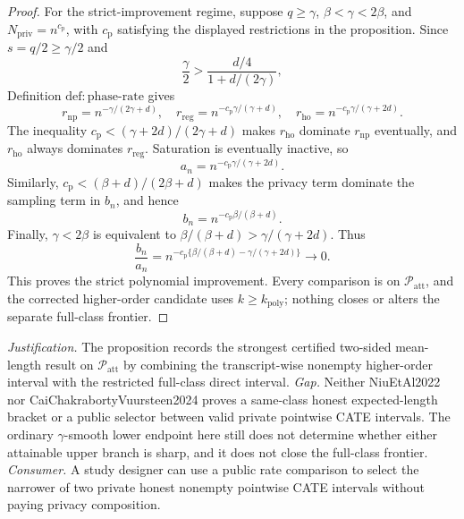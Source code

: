 \documentclass{article}
\begin{document}
\begin{proof}
For the strict-improvement regime, suppose \(q\ge\gamma\), \(\beta<\gamma<2\beta\), and \(N_{\mathrm{priv}}=n^{c_{\mathrm p}}\), with \(c_{\mathrm p}\) satisfying the displayed restrictions in the proposition.  Since \(s=q/2\ge\gamma/2\) and
\[
 \frac{\gamma}{2}>
 \frac{d/4}{1+d/(2\gamma)},
\]
Definition \(\mathrm{def{:}phase\text{-}rate}\) gives
\[
 r_{\mathrm{np}}=n^{-\gamma/(2\gamma+d)},
 \quad r_{\mathrm{reg}}=n^{-c_{\mathrm p}\gamma/(\gamma+d)},
 \quad r_{\mathrm{ho}}=n^{-c_{\mathrm p}\gamma/(\gamma+2d)}.
\tag{16}
\]
The inequality \(c_{\mathrm p}< (\gamma+2d)/(2\gamma+d)\) makes \(r_{\mathrm{ho}}\) dominate \(r_{\mathrm{np}}\) eventually, and \(r_{\mathrm{ho}}\) always dominates \(r_{\mathrm{reg}}\).  Saturation is eventually inactive, so
\[
 a_n=n^{-c_{\mathrm p}\gamma/(\gamma+2d)}.
\tag{17}
\]
Similarly, \(c_{\mathrm p}< (\beta+d)/(2\beta+d)\) makes the privacy term dominate the sampling term in \(b_n\), and hence
\[
 b_n=n^{-c_{\mathrm p}\beta/(\beta+d)}.
\tag{18}
\]
Finally, \(\gamma<2\beta\) is equivalent to \(\beta/(\beta+d)>\gamma/(\gamma+2d)\).  Thus
\[
 \frac{b_n}{a_n}
 =n^{-c_{\mathrm p}\{\beta/(\beta+d)-\gamma/(\gamma+2d)\}}
 \longrightarrow0.
\]
This proves the strict polynomial improvement.  Every comparison is on \(\mathcal P_{\mathrm{att}}\), and the corrected higher-order candidate uses \(k\ge k_{\mathrm{poly}}\); nothing closes or alters the separate full-class frontier.
\end{proof}
\par\smallskip\noindent \textit{Justification.} The proposition records the strongest certified two-sided mean-length result on \(\mathcal P_{\mathrm{att}}\) by combining the transcript-wise nonempty higher-order interval with the restricted full-class direct interval. \textit{Gap.} Neither NiuEtAl2022 nor CaiChakrabortyVuursteen2024 proves a same-class honest expected-length bracket or a public selector between valid private pointwise CATE intervals.  The ordinary \(\gamma\)-smooth lower endpoint here still does not determine whether either attainable upper branch is sharp, and it does not close the full-class frontier. \textit{Consumer.} A study designer can use a public rate comparison to select the narrower of two private honest nonempty pointwise CATE intervals without paying privacy composition.
\end{document}
